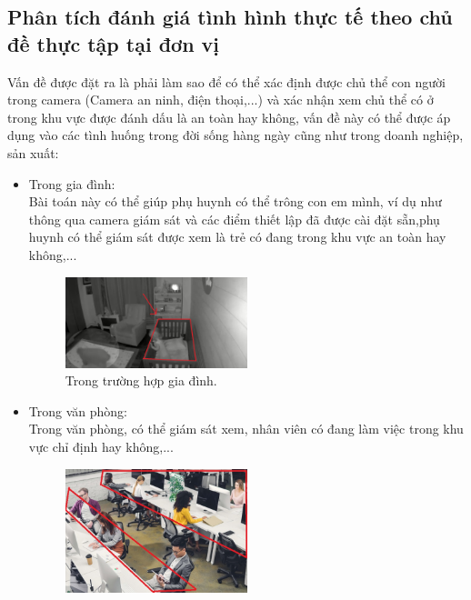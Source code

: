 \begin{flushleft}
    \subsection{Phân tích đánh giá tình hình thực tế theo chủ đề thực tập tại đơn vị}
    \fontsize{13}{13}\selectfont 
    Vấn đề được đặt ra là phải làm sao để có thể xác định được chủ thể con người trong camera (Camera an ninh, điện thoại,...) và xác nhận xem chủ thể có ở trong khu vực được đánh dấu là an toàn hay không, vấn đề này có thể được áp dụng vào các tình huống trong đời sống hàng ngày cũng như trong doanh nghiệp, sản xuất:\\ 
    
    \begin{itemize}
        \item Trong gia đình: \\
        Bài toán này có thể giúp phụ huynh có thể trông con em mình, ví dụ như thông qua camera giám sát và các điểm thiết lập đã được cài đặt sẵn,phụ huynh có thể giám sát được xem là trẻ có đang trong khu vực an toàn hay không,...
        \begin{figure}[htbp]
            \centering
            \includegraphics[width=0.5\textwidth]{images/TH1.jpg}
            \caption{Trong trường hợp gia đình.}
            \label{fig:img_1_GD}
        \end{figure}
        \item Trong văn phòng:\\
        Trong văn phòng, có thể giám sát xem, nhân viên có đang làm việc trong khu vực chỉ định hay không,...
        \begin{figure}[htbp]
            \centering
            \includegraphics[width=0.5\textwidth]{images/TH2.jpg}

\end{figure}
\end{itemize}
\end{flushleft}
